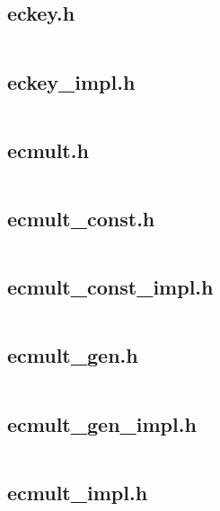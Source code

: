 \documentclass{article}
\begin{document}
\subsection{eckey.h}
\inputminted{cpp}{/home/dufferzafar/dev/@clones/bitcoin/src/secp256k1/src/eckey.h}
\newpage

\subsection{eckey\_impl.h}
\inputminted{cpp}{/home/dufferzafar/dev/@clones/bitcoin/src/secp256k1/src/eckey_impl.h}
\newpage

\subsection{ecmult.h}
\inputminted{cpp}{/home/dufferzafar/dev/@clones/bitcoin/src/secp256k1/src/ecmult.h}
\newpage

\subsection{ecmult\_const.h}
\inputminted{cpp}{/home/dufferzafar/dev/@clones/bitcoin/src/secp256k1/src/ecmult_const.h}
\newpage

\subsection{ecmult\_const\_impl.h}
\inputminted{cpp}{/home/dufferzafar/dev/@clones/bitcoin/src/secp256k1/src/ecmult_const_impl.h}
\newpage

\subsection{ecmult\_gen.h}
\inputminted{cpp}{/home/dufferzafar/dev/@clones/bitcoin/src/secp256k1/src/ecmult_gen.h}
\newpage

\subsection{ecmult\_gen\_impl.h}
\inputminted{cpp}{/home/dufferzafar/dev/@clones/bitcoin/src/secp256k1/src/ecmult_gen_impl.h}
\newpage

\subsection{ecmult\_impl.h}
\inputminted{cpp}{/home/dufferzafar/dev/@clones/bitcoin/src/secp256k1/src/ecmult_impl.h}
\newpage
\end{document}
